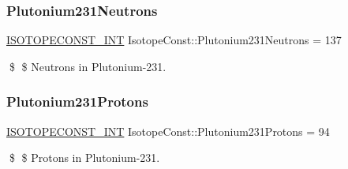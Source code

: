 \subsubsection{\texorpdfstring{Plutonium231\+Neutrons}{Plutonium231Neutrons}}
{\footnotesize\ttfamily \mbox{\hyperlink{group___isotope_const-_macros_ga5f18360b3e99483a35c32d789e62621c}{I\+S\+O\+T\+O\+P\+E\+C\+O\+N\+S\+T\+\_\+\+I\+NT}} Isotope\+Const\+::\+Plutonium231\+Neutrons = 137}

\$ \$ Neutrons in Plutonium-\/231. \mbox{\label{group___isotope_const-_plutonium-_pu231_gae083b67e4c90cb29080fe78b34e03e22}} 
\subsubsection{\texorpdfstring{Plutonium231\+Protons}{Plutonium231Protons}}
{\footnotesize\ttfamily \mbox{\hyperlink{group___isotope_const-_macros_ga5f18360b3e99483a35c32d789e62621c}{I\+S\+O\+T\+O\+P\+E\+C\+O\+N\+S\+T\+\_\+\+I\+NT}} Isotope\+Const\+::\+Plutonium231\+Protons = 94}

\$ \$ Protons in Plutonium-\/231. 